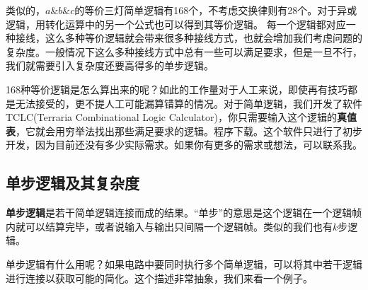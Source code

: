 类似的，$a\&b\&c$的等价三灯简单逻辑有168个，不考虑交换律则有28个。对于异或逻辑，用转化运算中的另一个公式也可以得到其等价逻辑。
每一个逻辑都对应一种接线，这么多种等价逻辑就会带来很多种接线方式，也就会增加我们考虑问题的复杂度。一般情况下这么多种接线方式中总有一些可以满足要求，但是一旦不行，我们就需要引入复杂度还要高得多的单步逻辑。

168种等价逻辑是怎么算出来的呢？如此的工作量对于人工来说，即使再有技巧都是无法接受的，更不提人工可能漏算错算的情况。对于简单逻辑，我们开发了软件TCLC(Terraria Combinational Logic Calculator)，你只需要输入这个逻辑的\textbf{真值表}，它就会用穷举法找出那些满足要求的逻辑。程序下载。这个软件只进行了初步开发，因为目前还没有多少实际需求。如果你有更多的需求或想法，可以联系我。

\subsection{单步逻辑及其复杂度}
\textbf{单步逻辑}是若干简单逻辑连接而成的结果。“单步”的意思是这个逻辑在一个逻辑帧内就可以结算完毕，或者说输入与输出只间隔一个逻辑帧。类似的我们也有$k$步逻辑。

单步逻辑有什么用呢？如果电路中要同时执行多个简单逻辑，可以将其中若干逻辑进行连接以获取可能的简化。这个描述非常抽象，我们来看一个例子。

